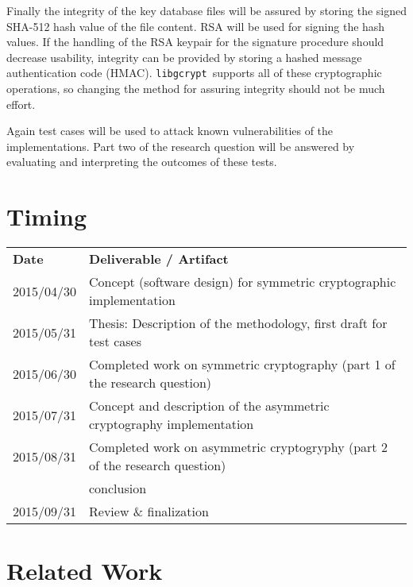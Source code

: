 \documentclass[a4paper,12pt]{article}
\newcommand{\libgcrypt}{\texttt{libgcrypt}~}
\begin{document}
Finally the integrity of the key database files will be assured by storing the signed SHA-512 hash value of the file content. RSA will be used for signing the hash values. If the handling of the RSA keypair for the signature procedure should decrease usability, integrity can be provided by storing a hashed message authentication code (HMAC). \libgcrypt supports all of these cryptographic operations, so changing the method for assuring integrity should not be much effort.

Again test cases will be used to attack known vulnerabilities of the implementations. Part two of the research question will be answered by evaluating and interpreting the outcomes of these tests.



\section{Timing}

\begin{table}[h]
\begin{tabular}{ll}
\textbf{Date} & \textbf{Deliverable / Artifact} \\
2015/04/30 & Concept (software design) for symmetric cryptographic implementation \\
2015/05/31 & Thesis: Description of the methodology, first draft for test cases \\
2015/06/30 & Completed work on symmetric cryptography (part 1 of the research question) \\
2015/07/31 & Concept and description of the asymmetric cryptography implementation \\
2015/08/31 & Completed work on asymmetric cryptogryphy (part 2 of the research question) \\
~          & conclusion \\ 
2015/09/31 & Review \& finalization
\end{tabular}
\end{table}

\section{Related Work}

\begingroup
\renewcommand{\section}[2]{}
\renewcommand{\refname}{}
\nocite{*}


\endgroup
\end{document}
